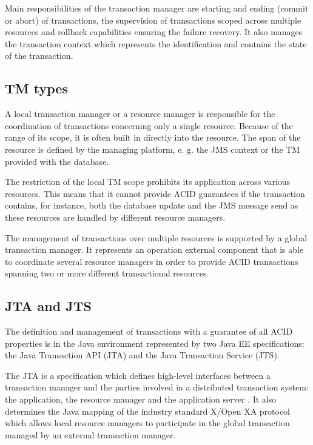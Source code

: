 \documentclass[oneside,
  digital, %
  table,   %
  nolof,     %
  nolot,     %
]{fithesis3}
\begin{document}
Main responsibilities of the transaction manager are starting and ending (commit or abort) of transactions, the supervision of transactions scoped across multiple resources and rollback capabilities ensuring the failure recovery. It also manages the transaction context which represents the identification and contains the state of the transaction.

\subsection{TM types}

A local transaction manager or a resource manager is responsible for the coordination of transactions concerning only a single resource. Because of the range of its scope, it is often built in directly into the resource. The span of the resource is defined by the managing platform, e. g. the JMS context or the TM provided with the database.  

The restriction of the local TM scope prohibits its application across various resources. This means that it cannot provide ACID guarantees if the transaction contains, for instance, both the database update and the JMS message send as these resources are handled by different resource managers.

The management of transactions over multiple resources is supported by a global transaction manager. It represents an operation external component that is able to coordinate several resource managers in order to provide ACID transactions spanning two or more different transactional resources.

\subsection{JTA and JTS}

The definition and management of transactions with a guarantee of all ACID properties is in the Java environment represented by two Java EE specifications: the Java Transaction API (JTA) and the Java Transaction Service (JTS). 

The JTA is a specification which defines high-level interfaces between a transaction manager and the parties involved in a distributed transaction system: the application, the resource manager and the application server \cite{jta}. It also determines the Java mapping of the industry standard X/Open XA protocol which allows local resource managers to participate in the global transaction managed by an external transaction manager.
\end{document}
